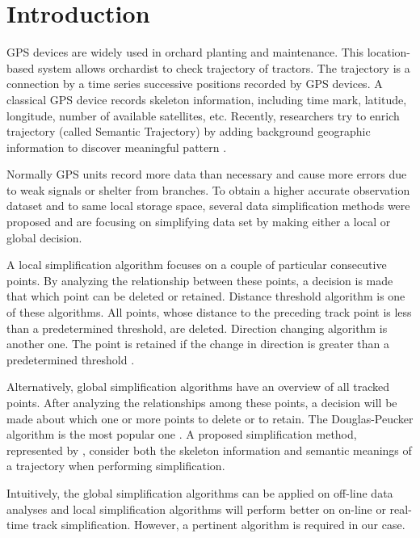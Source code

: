 


\section{Introduction}

GPS devices are widely used in orchard planting and maintenance. This location-based system allows orchardist to check trajectory of tractors. The trajectory is a connection by a time series successive positions recorded by GPS devices. A classical GPS device records skeleton information, including time mark, latitude, longitude, number of available satellites, etc. Recently, researchers try to enrich trajectory (called Semantic Trajectory) by adding background geographic information to discover meaningful pattern \citep{ying2011semantic}. 


Normally GPS units record more data than necessary and cause more errors due to weak signals or shelter from branches. To obtain a higher accurate observation dataset and to same local storage space, several data simplification methods were proposed and are focusing on simplifying data set by making either a local or global decision. 

A local simplification algorithm focuses on a couple of particular consecutive points. By analyzing the relationship between these points, a decision is made that which point can be deleted or retained. Distance threshold algorithm is one of these algorithms. All points, whose distance to the preceding track point is less than a predetermined threshold, are deleted. Direction changing algorithm is another one. The point is retained if the change in direction is greater than a predetermined threshold  \citep{ivanov2012real}. 

Alternatively, global simplification algorithms have an overview of all tracked points. After analyzing the relationships among these points, a decision will be made about which one or more points to delete or to retain. The Douglas-Peucker algorithm is the most popular one  \citep{douglas1973algorithms}. A proposed simplification method, represented by \cite{chen2009trajectory}, consider both the skeleton information and semantic meanings of a trajectory when performing simplification. 


Intuitively, the global simplification algorithms can be applied on off-line data analyses and local simplification algorithms will perform better on on-line or real-time track simplification. However, a pertinent algorithm is required in our case. 


